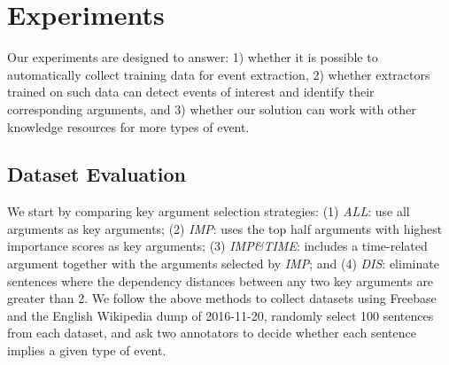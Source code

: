 \section{Experiments}
Our experiments are designed to answer: 1) whether it is possible to automatically collect training data for event extraction, 2) whether
extractors trained on such data can detect events of interest and identify their corresponding arguments, and 3) whether our solution can
work with other knowledge resources for more types of event.

 \subsection{Dataset Evaluation}\label{sec:evalhypo}
We start by comparing key argument selection strategies: %
(1) \emph{ALL}: use all arguments as key arguments; (2) \emph{IMP}:
uses the top half arguments with highest importance scores as key arguments;
(3) \emph{IMP\&TIME}:  includes a time-related argument together with  the arguments selected by \emph{IMP};
and (4) \emph{DIS}: eliminate sentences where the dependency distances
 between any two key arguments are greater than 2.
We follow the above methods to collect datasets using Freebase and the English Wikipedia dump of 2016-11-20,
randomly select 100 sentences from each dataset, and ask two annotators to decide whether each sentence implies a given type of event.




